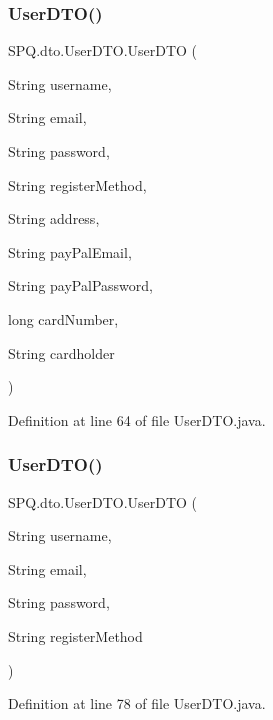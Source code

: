 \subsubsection{\texorpdfstring{User\+D\+T\+O()}{UserDTO()}\hspace{0.1cm}{\footnotesize\ttfamily [10/11]}}
{\footnotesize\ttfamily S\+P\+Q.\+dto.\+User\+D\+T\+O.\+User\+D\+TO (\begin{DoxyParamCaption}\item[{String}]{username,  }\item[{String}]{email,  }\item[{String}]{password,  }\item[{String}]{register\+Method,  }\item[{String}]{address,  }\item[{String}]{pay\+Pal\+Email,  }\item[{String}]{pay\+Pal\+Password,  }\item[{long}]{card\+Number,  }\item[{String}]{cardholder }\end{DoxyParamCaption})}



Definition at line 64 of file User\+D\+T\+O.\+java.

\mbox{\label{class_s_p_q_1_1dto_1_1_user_d_t_o_a96eac4c18d86e06c5fd796e69322e5fb}} 
\subsubsection{\texorpdfstring{User\+D\+T\+O()}{UserDTO()}\hspace{0.1cm}{\footnotesize\ttfamily [11/11]}}
{\footnotesize\ttfamily S\+P\+Q.\+dto.\+User\+D\+T\+O.\+User\+D\+TO (\begin{DoxyParamCaption}\item[{String}]{username,  }\item[{String}]{email,  }\item[{String}]{password,  }\item[{String}]{register\+Method }\end{DoxyParamCaption})}



Definition at line 78 of file User\+D\+T\+O.\+java.



